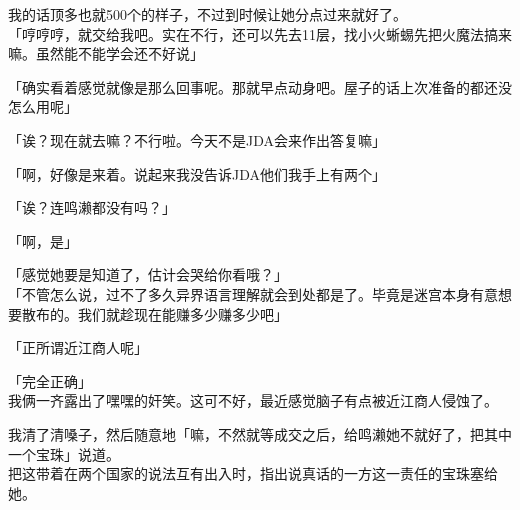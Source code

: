 我的话顶多也就500个的样子，不过到时候让她分点过来就好了。\\

「哼哼哼，就交给我吧。实在不行，还可以先去11层，找小火蜥蜴先把火魔法搞来嘛。虽然能不能学会还不好说」

「确实看着感觉就像是那么回事呢。那就早点动身吧。屋子的话上次准备的都还没怎么用呢」

「诶？现在就去嘛？不行啦。今天不是JDA会来作出答复嘛」

「啊，好像是来着。说起来我没告诉JDA他们我手上有两个」

「诶？连鸣濑都没有吗？」

「啊，是」

「感觉她要是知道了，估计会哭给你看哦？」\\

「不管怎么说，过不了多久异界语言理解就会到处都是了。毕竟是迷宫本身有意想要散布的。我们就趁现在能赚多少赚多少吧」

「正所谓近江商人呢」

「完全正确」\\

我俩一齐露出了嘿嘿的奸笑。这可不好，最近感觉脑子有点被近江商人侵蚀了。

我清了清嗓子，然后随意地「嘛，不然就等成交之后，给鸣濑她不就好了，把其中一个宝珠」说道。\\

把这带着在两个国家的说法互有出入时，指出说真话的一方这一责任的宝珠塞给她。


